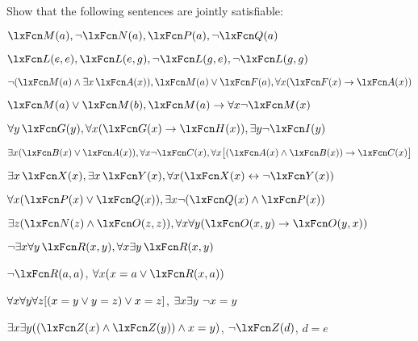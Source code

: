 \problempart
Show that the following sentences are jointly satisfiable:
\begin{compactlist}
\item  $\atom{M}{a}, \enot \atom{N}{a}, \atom{P}{a}, \enot \atom{Q}{a}$
\item $\atom{L}{e,e}, \atom{L}{e,g}, \enot \atom{L}{g,e}, \enot \atom{L}{g,g}$
\item $\enot (\atom{M}{a} \eand \exists x\, \atom{A}{x}), \atom{M}{a} \eor \atom{F}{a}, \forall x(\atom{F}{x} \eif \atom{A}{x})$
\item $\atom{M}{a} \eor \atom{M}{b}, \atom{M}{a} \eif \forall x \enot \atom{M}{x}$
\item $\forall y\, \atom{G}{y}, \forall x (\atom{G}{x} \eif \atom{H}{x}), \exists y \enot \atom{I}{y}$
\item $\exists x(\atom{B}{x} \eor \atom{A}{x}), \forall x \enot \atom{C}{x}, \forall x\bigl[(\atom{A}{x} \eand \atom{B}{x}) \eif \atom{C}{x}\bigr]$
\item $\exists x\, \atom{X}{x}, \exists x\, \atom{Y}{x}, \forall x(\atom{X}{x} \eiff \enot \atom{Y}{x})$
\item $\forall x(\atom{P}{x} \eor \atom{Q}{x}), \exists x\enot(\atom{Q}{x} \eand \atom{P}{x})$
\item $\exists z(\atom{N}{z} \eand \atom{O}{z,z}), \forall x\forall y(\atom{O}{x,y} \eif \atom{O}{y,x})$
\item $\enot \exists x \forall y\, \atom{R}{x,y}, \forall x \exists y\, \atom{R}{x,y}$
\item $\enot \atom{R}{a,a}$, $\forall x (x=a \eor \atom{R}{x,a})$
\item $\forall x\forall y\forall z[(x=y \vee y=z )\vee x=z]$, $\exists x\exists y\ \neg x= y$
\item $\exists x\exists y((\atom{Z}{x} \eand \atom{Z}{y} )\eand x=y)$, $\enot \atom{Z}{d}$, $d=e$
\end{compactlist}

